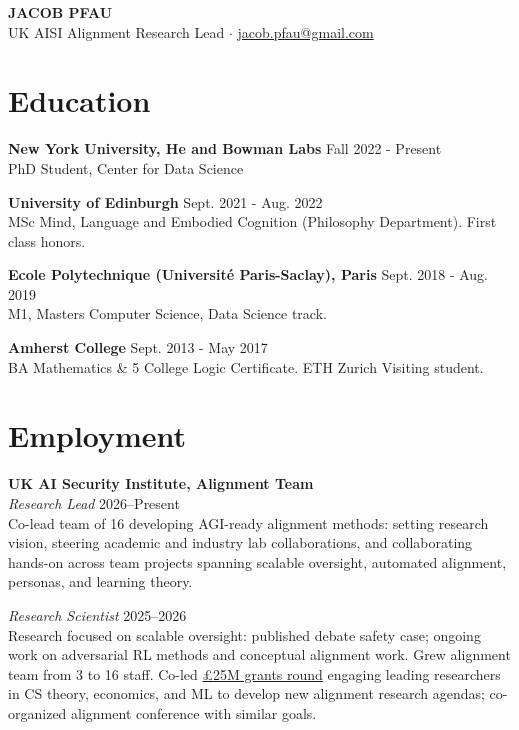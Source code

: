 \documentclass[11pt,letterpaper]{article}
\begin{document}
\begin{center}
    {\LARGE\textbf{JACOB PFAU}}\\[4pt]
    UK AISI Alignment Research Lead $\cdot$
    \href{mailto:jacob.pfau@gmail.com}{jacob.pfau@gmail.com} 
    
\end{center}
\vspace{-10pt}

\section{Education}

\textbf{New York University, He and Bowman Labs} \hfill Fall 2022 - Present\\
PhD Student, Center for Data Science
\vspace{4pt}

\textbf{University of Edinburgh} \hfill Sept. 2021 - Aug. 2022\\
MSc Mind, Language and Embodied Cognition (Philosophy Department). First class honors.
\vspace{4pt}

\textbf{Ecole Polytechnique (Université Paris-Saclay), Paris} \hfill Sept. 2018 - Aug. 2019\\
M1, Masters Computer Science, Data Science track. 
\vspace{4pt}

\textbf{Amherst College} \hfill Sept. 2013 - May 2017\\
BA Mathematics \& 5 College Logic Certificate. ETH Zurich Visiting student. 

\section{Employment}

\textbf{UK AI Security Institute, Alignment Team}\\
\textit{Research Lead} \hfill 2026--Present\\
Co-lead team of 16 developing AGI-ready alignment methods: setting research vision, steering academic and industry lab collaborations, and collaborating hands-on across team projects spanning scalable oversight, automated alignment, personas, and learning theory.
\vspace{2pt}

\textit{Research Scientist} \hfill 2025--2026\\
Research focused on scalable oversight: published debate safety case; ongoing work on adversarial RL methods and conceptual alignment work. Grew alignment team from 3 to 16 staff. Co-led \href{https://alignmentproject.aisi.gov.uk/}{£25M grants round} engaging leading researchers in CS theory, economics, and ML to develop new alignment research agendas; co-organized alignment conference with similar goals.
\vspace{4pt}
\end{document}
